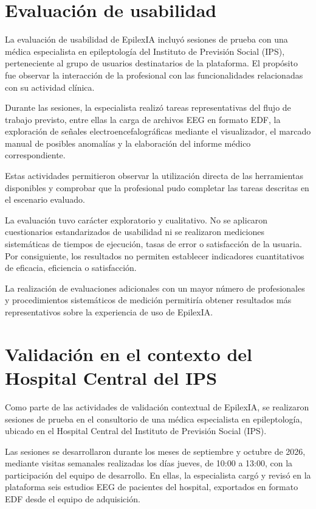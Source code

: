 \section{Evaluación de usabilidad}

La evaluación de usabilidad de EpilexIA incluyó sesiones de prueba con una médica especialista en epileptología del Instituto de Previsión Social (IPS), perteneciente al grupo de usuarios destinatarios de la plataforma. El propósito fue observar la interacción de la profesional con las funcionalidades relacionadas con su actividad clínica.

Durante las sesiones, la especialista realizó tareas representativas del flujo de trabajo previsto, entre ellas la carga de archivos EEG en formato EDF, la exploración de señales electroencefalográficas mediante el visualizador, el marcado manual de posibles anomalías y la elaboración del informe médico correspondiente.

Estas actividades permitieron observar la utilización directa de las herramientas disponibles y comprobar que la profesional pudo completar las tareas descritas en el escenario evaluado.

La evaluación tuvo carácter exploratorio y cualitativo. No se aplicaron cuestionarios estandarizados de usabilidad ni se realizaron mediciones sistemáticas de tiempos de ejecución, tasas de error o satisfacción de la usuaria. Por consiguiente, los resultados no permiten establecer indicadores cuantitativos de eficacia, eficiencia o satisfacción.

La realización de evaluaciones adicionales con un mayor número de profesionales y procedimientos sistemáticos de medición permitiría obtener resultados más representativos sobre la experiencia de uso de EpilexIA.

\section{Validación en el contexto del Hospital Central del IPS}

Como parte de las actividades de validación contextual de EpilexIA, se realizaron sesiones de prueba en el consultorio de una médica especialista en epileptología, ubicado en el Hospital Central del Instituto de Previsión Social (IPS).

Las sesiones se desarrollaron durante los meses de septiembre y octubre de 2026, mediante visitas semanales realizadas los días jueves, de 10:00 a 13:00, con la participación del equipo de desarrollo.
En ellas, la especialista cargó y revisó en la plataforma seis estudios EEG de pacientes del hospital, exportados en formato EDF desde el equipo de adquisición.


